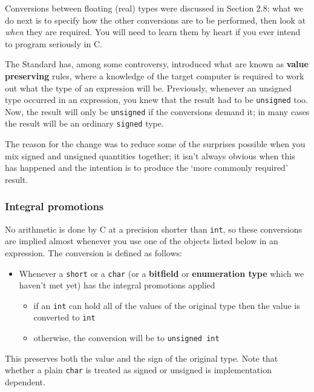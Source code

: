    Conversions between floating (real) types were discussed in Section 2.8; what we do next is to specify how the other conversions are
    to be performed, then look at \textit{when} they are required. You will
    need to learn them by heart if you ever intend to program seriously
    in C.


   The Standard has, among some controversy, introduced what are known as
    \textbf{value preserving} rules, where a knowledge of the target
    computer is required to work out what the type of an expression will be.
    Previously, whenever an unsigned type occurred in an expression, you knew
    that the result had to be \texttt{unsigned} too. Now, the result will
    only be \texttt{unsigned} if the conversions demand it; in many cases
    the result will be an ordinary \texttt{signed} type.


   The reason for the change was to reduce some of the surprises possible
    when you mix signed and unsigned quantities together; it isn't always
    obvious when this has happened and the intention is to produce the
    `more commonly required' result.


   \subsubsection{Integral promotions}
    

    No arithmetic is done by C at a precision shorter than
     \texttt{int}, so these conversions are implied almost whenever you
     use one of the objects listed below in an expression. The conversion is
     defined as follows:


    \begin{itemize}
     \item Whenever a \texttt{short} or a \texttt{char} (or a
      \textbf{bitfield} or \textbf{enumeration type} which we haven't met
      yet) has the integral promotions applied
      \begin{itemize}
       \item if an \texttt{int} can hold all of the values of the original
        type then the value is converted to \texttt{int}
       \item otherwise, the conversion will be to \texttt{unsigned int}
      \end{itemize}
     
    \end{itemize}

    This preserves both the value and the sign of the original type. Note
     that whether a plain \texttt{char} is treated as signed or unsigned
     is implementation dependent.


